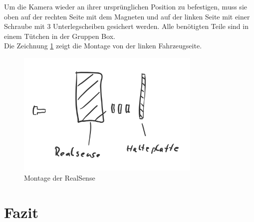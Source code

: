 \documentclass[a4paper,12pt]{report}
\begin{document}
Um die Kamera wieder an ihrer ursprünglichen Position zu befestigen, muss sie oben auf der rechten Seite mit dem Magneten und auf der linken Seite mit einer Schraube mit 3 Unterlegscheiben gesichert werden.
Alle benötigten Teile sind in einem Tütchen in der Gruppen Box. \\
Die Zeichnung \ref{RealSense-Montage} zeigt die Montage von der linken Fahrzeugseite.
\begin{figure}[ht]
	\centering
	\includegraphics[width=250pt,keepaspectratio]{assets/RealSense-Montage.PNG}
	\caption{Montage der RealSense}
	\label{RealSense-Montage}
\end{figure}


\chapter{Fazit}

\end{document}
